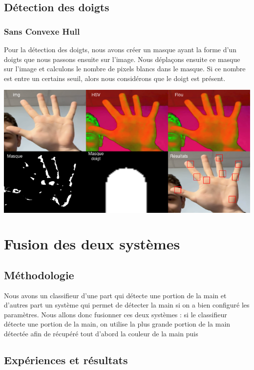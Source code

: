 \documentclass[11pt]{article}
\begin{document}
\subsection{Détection des doigts}
\subsubsection{Sans Convexe Hull}
Pour la détection des doigts, nous avons créer un masque ayant la forme d'un doigts que nous passons ensuite sur l'image. Nous déplaçons ensuite ce masque sur l'image et calculons le nombre de pixels blancs dans le masque. Si ce nombre est entre un certains seuil, alors nous considérons que le doigt est présent. \bigbreak

\includegraphics[width=\textwidth]{images/detect_fingers.png}


\newpage

\section{Fusion des deux systèmes}
\subsection{Méthodologie}
Nous avons un classifieur d'une part qui détecte une portion de la main et d'autres part un système qui permet de détecter la main si on a bien configuré les paramètres. Nous allons donc fusionner ces deux systèmes : si le classifieur détecte une portion de la main, on utilise la plus grande portion de la main détectée afin de récupéré tout d'abord la couleur de la main puis
\subsection{Expériences et résultats}
\end{document}
